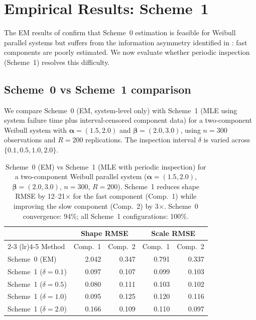 \documentclass[12pt]{article}
\theoremstyle{definition}
\theoremstyle{remark}
\newcommand{\balpha}{\boldsymbol{\alpha}}
\newcommand{\bbeta}{\boldsymbol{\beta}}
\begin{document}
\section{Empirical Results: Scheme~1}
\label{sec:scheme1-results}

The EM results of  confirm that Scheme~0
estimation is feasible for Weibull parallel systems but suffers
from the information asymmetry identified in \citet{Towell2026}:
fast components are poorly estimated.  We now evaluate whether
periodic inspection (Scheme~1) resolves this difficulty.

\subsection{Scheme~0 vs Scheme~1 comparison}
\label{sec:scheme1-comparison}

We compare Scheme~0 (EM, system-level only) with Scheme~1
(MLE using system failure time plus interval-censored component
data) for a two-component Weibull system with
$\balpha = (1.5, 2.0)$ and $\bbeta = (2.0, 3.0)$, using
$n = 300$ observations and $R = 200$ replications.  The
inspection interval $\delta$ is varied across
$\{0.1, 0.5, 1.0, 2.0\}$.

\begin{table}[t]
\centering
\caption{%
  Scheme~0 (EM) vs Scheme~1 (MLE with periodic inspection)
  for a two-component Weibull parallel system
  ($\balpha = (1.5, 2.0)$, $\bbeta = (2.0, 3.0)$,
  $n = 300$, $R = 200$).  Scheme~1 reduces shape RMSE
  by 12--21$\times$ for the fast component (Comp.~1)
  while improving the slow component (Comp.~2) by 3$\times$.
  Scheme~0 convergence: 94\%; all Scheme~1 configurations: 100\%.
}
\label{tab:scheme-comparison}
\small
\begin{tabular}{l rrrr}
\toprule
& \multicolumn{2}{c}{Shape RMSE} & \multicolumn{2}{c}{Scale RMSE} \\
\cmidrule(lr){2-3} \cmidrule(lr){4-5}
Method & Comp.\ 1 & Comp.\ 2 & Comp.\ 1 & Comp.\ 2 \\
\midrule
Scheme~0 (EM)              & 2.042 & 0.347 & 0.791 & 0.337 \\
Scheme~1 ($\delta = 0.1$)  & 0.097 & 0.107 & 0.099 & 0.103 \\
Scheme~1 ($\delta = 0.5$)  & 0.080 & 0.111 & 0.103 & 0.102 \\
Scheme~1 ($\delta = 1.0$)  & 0.095 & 0.125 & 0.120 & 0.116 \\
Scheme~1 ($\delta = 2.0$)  & 0.166 & 0.109 & 0.110 & 0.097 \\
\bottomrule
\end{tabular}
\end{table}
\end{document}
